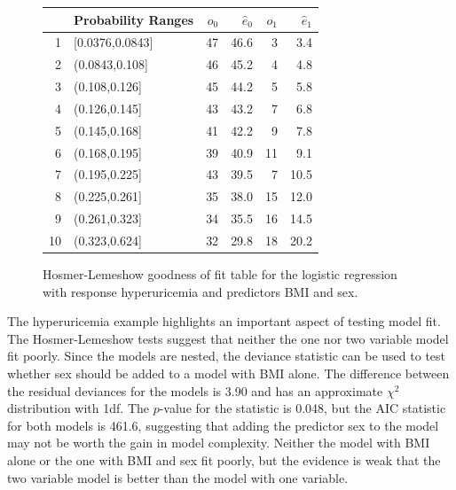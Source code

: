 \begin{figure}[ht]
\centering
\begin{tabular}{rlrrrr}
  \hline
 & Probability Ranges & $o_0$ & $\hat{e}_0$ & $o_1$ & $\hat{e}_1$ \\
  \hline
1 & [0.0376,0.0843] & 47 & 46.6 & 3 & 3.4 \\
  2 & (0.0843,0.108] & 46 & 45.2 & 4 & 4.8 \\
  3 & (0.108,0.126] & 45 & 44.2 & 5 & 5.8 \\
  4 & (0.126,0.145] & 43 & 43.2 & 7 & 6.8 \\
  5 & (0.145,0.168] & 41 & 42.2 & 9 & 7.8 \\
  6 & (0.168,0.195] & 39 & 40.9 & 11 & 9.1 \\
  7 & (0.195,0.225] & 43 & 39.5 & 7 & 10.5 \\
  8 & (0.225,0.261] & 35 & 38.0 & 15 & 12.0 \\
  9 & (0.261,0.323] & 34 & 35.5 & 16 & 14.5 \\
  10 & (0.323,0.624] & 32 & 29.8 & 18 & 20.2 \\
   \hline
\end{tabular}
\caption{Hosmer-Lemeshow goodness of fit table for the
       logistic regression with response hyperuricemia and predictors BMI and sex.}
\label{figure:HLTestHyperuricemiaBMISex}
\end{figure}

The hyperuricemia example highlights an important aspect of testing model fit.  The Hosmer-Lemeshow tests suggest that neither the one nor two variable model fit poorly. Since the models are nested, the deviance statistic can be used to test whether sex should be added to a model with BMI alone.  The difference between the residual deviances for the models is 3.90 and has an approximate $\chi^2$ distribution with 1df.  The $p$-value for the statistic is 0.048, but the AIC statistic for both models is 461.6, suggesting that adding the predictor sex to the model may not be worth the gain in model complexity.  Neither the model with BMI alone or the one with BMI and sex fit poorly, but the evidence is weak that the two variable model is better than the model with one variable.

